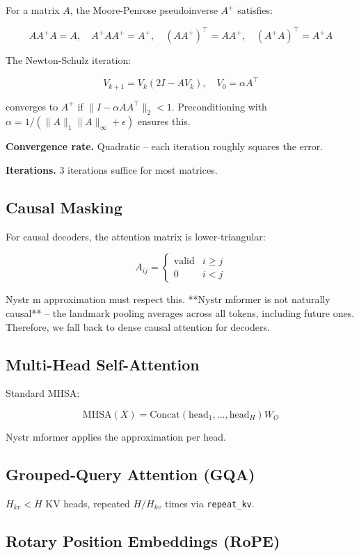 For a matrix $A$, the Moore-Penrose pseudoinverse $A^+$ satisfies:

\[
A A^+ A = A, \quad A^+ A A^+ = A^+, \quad (A A^+)^\top = A A^+, \quad (A^+ A)^\top = A^+ A
\tag{3.6}
\]

The Newton-Schulz iteration:

\[
V_{k+1} = V_k (2 I - A V_k), \quad V_0 = \alpha A^\top
\tag{3.7}
\]

converges to $A^+$ if $\|I - \alpha A A^\top\|_2 < 1$. Preconditioning 
with $\alpha = 1 / (\|A\|_1 \|A\|_\infty + \epsilon)$ ensures this.

\textbf{Convergence rate.} Quadratic -- each iteration roughly squares the error.

\textbf{Iterations.} 3 iterations suffice for most matrices.

\subsection{Causal Masking}

For causal decoders, the attention matrix is lower-triangular:

\[
A_{ij} = \begin{cases} \text{valid} & i \geq j \\ 0 & i < j \end{cases}
\tag{3.8}
\]

Nystr m approximation must respect this. **Nystr mformer is not naturally 
causal** -- the landmark pooling averages across all tokens, including 
future ones. Therefore, we fall back to dense causal attention for decoders.

\subsection{Multi-Head Self-Attention}

Standard MHSA:

\[
\text{MHSA}(X) = \mathrm{Concat}(\text{head}_1, \dots, \text{head}_H) W_O
\tag{3.9}
\]

Nystr mformer applies the approximation per head.

\subsection{Grouped-Query Attention (GQA)}

$H_{kv} < H$ KV heads, repeated $H / H_{kv}$ times via \texttt{repeat\_kv}.

\subsection{Rotary Position Embeddings (RoPE)}

